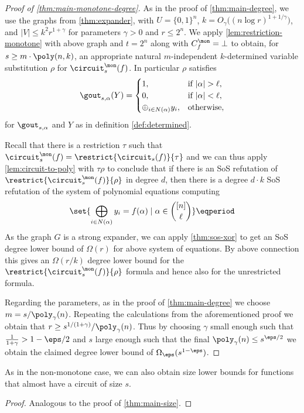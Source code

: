 \begin{proof}[Proof of \cref{thm:main-monotone-degree}]
  As in the proof of \cref{thm:main-degree}, we use the graphs from
  \cref{thm:expander}, with $U = \{0,1\}^n$,
  $k = O_{\gamma}\big((n \log r)^{1 + 1/\gamma}\big)$, and
  $|V| \le k^2 r^{1+\gamma}$ for parameters $\gamma > 0$ and
  $r \le 2^n$. We apply \cref{lem:restriction-monotone} with above
  graph and $t=2^n$ along with $C_f^\mon = \bot$ to obtain, for
  $s \ge m \cdot \poly(n, k)$, an appropriate natural $m$-independent
  $k$-determined variable substitution $\rho$ for
  $\circuit^\mon_s(f)$. In particular $\rho$ satisfies
  \begin{align*}
    \gout_{s, \alpha}(Y) =
    \begin{cases}
      1, &\text{if~} |\alpha| > \ell,\\
      0, &\text{if~} |\alpha| < \ell,\\
      \oplus_{i \in N(\alpha)} y_i, &\text{otherwise},\\
    \end{cases}
  \end{align*}
  for $\gout_{s, \alpha}$ and $Y$ as in definition
  \cref{def:determined}.

  Recall that there is a restriction $\tau$ such that
  $\circuit_s^\mon(f) = \restrict{\circuit_s(f)}{\tau}$ and we can
  thus apply \cref{lem:circuit-to-poly} with $\tau\rho$ to conclude
  that if there is an SoS refutation of
  $\restrict{\circuit^\mon_s(f)}{\rho}$ in degree $d$, then there is a
  degree $d \cdot k$ SoS refutation of the system of polynomial
  equations computing
  \begin{align}
    \set{
    \bigoplus_{i \in N(\alpha)} y_i = f(\alpha)
    \mid
    \alpha \in \binom{[n]}{\ell}
    }
    \eqperiod
  \end{align}
  As the graph $G$ is a strong expander, we can apply
  \cref{thm:sos-xor} to get an SoS degree lower bound of $\Omega(r)$
  for above system of equations. By above connection this gives an
  $\Omega(r/k)$ degree lower bound for the
  $\restrict{\circuit^\mon_s(f)}{\rho}$ formula and hence also for the
  unrestricted formula.

  Regarding the parameters, as in the proof of \cref{thm:main-degree}
  we choose $m = s/\poly_\gamma(n)$. Repeating the
  calculations from the aforementioned proof we obtain that
  $r \ge s^{1/(1+\gamma)}/\poly_\gamma(n)$. Thus by choosing
  $\gamma$ small enough such that $\frac{1}{1 + \gamma} > 1 - \eps/2$
  and $s$ large enough such that the final
  $\poly_\gamma(n) \le s^{\eps/2}$ we obtain the claimed degree lower
  bound of $\Omega_\eps(s^{1-\eps})$.
\end{proof}

As in the non-monotone case, we can also obtain size lower bounds for
functions that almost have a circuit of size $s$.

\MonotoneSize*

\begin{proof}
  Analogous to the proof of \cref{thm:main-size}.
\end{proof}